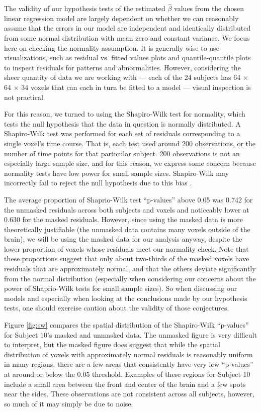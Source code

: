 \par \indent The validity of our hypothesis tests of the estimated 
$\hat{\beta}$ values from the chosen linear regression model are largely 
dependent on whether we can reasonably assume that the errors in our model 
are independent and identically distributed from some normal distribution 
with mean zero and constant variance. We focus here on checking the normality 
assumption. It is generally wise to use visualizations, such as residual vs. 
fitted values plots and quantile-quantile plots to inspect residuals for 
patterns and abnormalities. However, considering the sheer quantity of data 
we are working with --- each of the 24 subjects has 64 $\times$ 64 $\times$ 34 
voxels that can each in turn be fitted to a model --- visual inspection is 
not practical. 

For this reason, we turned to using the Shapiro-Wilk test for normality, 
which tests the null hypothesis that the data in question is normally 
distributed. A Shapiro-Wilk test was performed for each set of residuals 
corresponding to a single voxel's time course. That is, each test used around 
200 observations, or the number of time points for that particular subject. 
200 observations is not an especially large sample size, and for this reason, 
we express some concern because normality tests have low power for small 
sample sizes. Shapiro-Wilk may incorrectly fail to reject the null hypothesis 
due to this bias \cite{ghasemi2012normality}. 

The average proportion of Shaprio-Wilk test ``p-values'' above 0.05 was 0.742 
for the unmasked residuals across both subjects and voxels and noticeably 
lower at 0.630 for the masked residuals. However, since using the masked data 
is more theoretically justifiable (the unmasked data contains many voxels 
outside of the brain), we will be using the masked data for our analysis 
anyway, despite the lower proportion of voxels whose residuals meet our 
normality check. Note that these proportions suggest that only about 
two-thirds of the masked voxels have residuals that are approximately normal, 
and that the others deviate significantly from the normal distribution 
(especially when considering our concerns about the power of Shaprio-Wilk 
tests for small sample sizes). So when discussing our models and especially 
when looking at the conclusions made by our hypothesis tests, one should 
exercise caution about the validity of those conjectures. 

Figure \ref{fig:sw} compares the spatial distribution of the Shapiro-Wilk 
``p-values'' for Subject 10's masked and unmasked data. The unmasked figure 
is very difficult to interpret, but the masked figure does suggest that while 
the spatial distribution of voxels with approximately normal residuals is 
reasonably uniform in many regions, there are a few areas that consistently 
have very low ``p-values'' at around or below the 0.05 threshold. Examples of 
these regions for Subject 10 include a small area between the front and center 
of the brain and a few spots near the sides. These observations are not 
consistent across all subjects, however, so much of it may simply be due to 
noise. 

